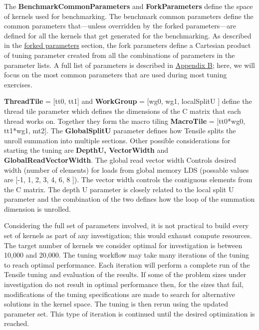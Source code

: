 \documentclass[]{article}
\begin{document}
The  {\color{ForestGreen} \bf BenchmarkCommonParameters} and  {\color{ForestGreen} \bf ForkParameters} define the space of kernels used for benchmarking. The benchmark common parameters define the common parameters that---unless overridden by the forked parameters---are defined for all the kernels that get generated for the benchmarking. As described in the \hyperref[sec:forkParams]{forked parameters} section, the fork parameters define a Cartesian product of tuning parameter created from all the combinations of parameters in the parameter lists. A full list of parameters is described in \hyperref[sec:appendixB]{Appendix B}; here, we will focus on the most common parameters that are used during most tuning exercises.

{\color{ForestGreen} \bf ThreadTile} = [tt0, tt1] and {\color{ForestGreen} \bf  WorkGroup} = [wg0, wg1, localSplitU ] define the thread tile parameter which defines the dimensions of the C matrix that each thread works on. Together they form the macro tiling {\color{ForestGreen} \bf MacroTile} = [tt0*wg0, tt1*wg1, mt2]. The {\color{ForestGreen} \bf GlobalSplitU} parameter defines how Tensile splits the unroll summation into multiple sections. Other possible considerations for starting the tuning are {\color{ForestGreen} \bf DepthU, VectorWidth} and {\color{ForestGreen} \bf GlobalReadVectorWidth}. The global read vector width Controls desired width (number of elements) for loads from global memory LDS (possable values are [-1, 1, 2, 3, 4, 6, 8 ]). The vector width controls the contiguous elements from the C matrix. The depth U parameter is closely related to the local split U parameter and the combination of the two defines how the loop of the summation dimension is unrolled.

Considering the full set of parameters involved, it is not practical to build every set of kernels as part of any investigation; this would exhaust compute resources. The target number of kernels we consider optimal for investigation is between 10,000 and 20,000. The tuning workflow may take many iterations of the tuning to reach optimal performance. Each iteration will perform a complete run of the Tensile tuning and evaluation of the results. If some of the problem sizes under investigation do not result in optimal performance then, for the sizes that fail, modifications of the tuning specifications are made to search for alternative solutions in the kernel space. The tuning is then rerun using the updated parameter set. This type of iteration is continued until the desired optimization is reached.
\end{document}
